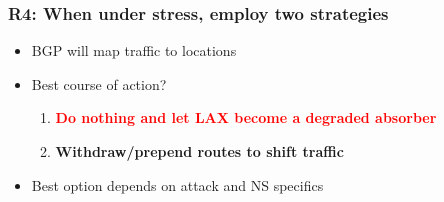 \documentclass[11pt,show 
notes,notheorems,noamsthm,blank]{beamer} %
\begin{document}
\begin{frame}
 \frametitle{R4: When under stress, employ two strategies}
 \begin{figure}
\centering

  
  \label{fig:nl-deployment}

\end{figure}



\pause
\begin{itemize}
 \item BGP will map traffic to locations
 \item Best course of action?
 \begin{enumerate}
   \item \textcolor{red}{\textbf{Do nothing and let LAX become a degraded 
absorber} }

\pause
   \item \textcolor{inlinks}{\textbf{Withdraw/prepend routes to shift traffic  }}

 \end{enumerate}
\pause
 \item Best option depends on attack and NS specifics
\end{itemize}


\end{frame}
\end{document}
